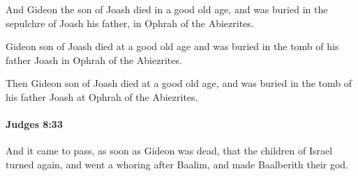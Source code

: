 			\begin{versebox}
					\item[BHS] 
					\item[ASV] And Gideon the son of Joash died in a good old age, and was buried in the sepulchre of Joash his father, in Ophrah of the Abiezrites.
					\item[NIV] Gideon son of Joash died at a good old age and was buried in the tomb of his father Joash in Ophrah of the Abiezrites.
					\item[NRSV] Then Gideon son of Joash died at a good old age, and was buried in the tomb of his father Joash at Ophrah of the Abiezrites.
			\end{versebox}

		\paragraph{Judges 8:33} %
			\label{JUDGES-8-33}

			And it came to pass, as soon as Gideon was dead, that the children of Israel turned again, and went a whoring after Baalim, and made Baalberith their god.

